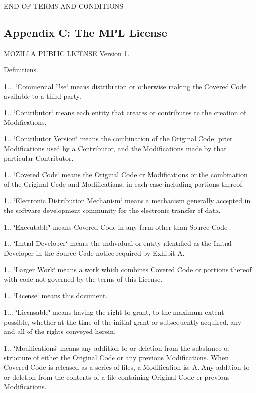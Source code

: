 E\+N\+D O\+F T\+E\+R\+M\+S A\+N\+D C\+O\+N\+D\+I\+T\+I\+O\+N\+S

\subsection*{Appendix C\+: The M\+P\+L License }

M\+O\+Z\+I\+L\+L\+A P\+U\+B\+L\+I\+C L\+I\+C\+E\+N\+S\+E Version 1.


\begin{DoxyEnumerate}
\item Definitions.

1... \char`\"{}\+Commercial Use\char`\"{} means distribution or otherwise making the Covered Code available to a third party.

1.. \char`\"{}\+Contributor\char`\"{} means each entity that creates or contributes to the creation of Modifications.

1.. \char`\"{}\+Contributor Version\char`\"{} means the combination of the Original Code, prior Modifications used by a Contributor, and the Modifications made by that particular Contributor.

1.. \char`\"{}\+Covered Code\char`\"{} means the Original Code or Modifications or the combination of the Original Code and Modifications, in each case including portions thereof.

1.. \char`\"{}\+Electronic Distribution Mechanism\char`\"{} means a mechanism generally accepted in the software development community for the electronic transfer of data.

1.. \char`\"{}\+Executable\char`\"{} means Covered Code in any form other than Source Code.

1.. \char`\"{}\+Initial Developer\char`\"{} means the individual or entity identified as the Initial Developer in the Source Code notice required by Exhibit A.

1.. \char`\"{}\+Larger Work\char`\"{} means a work which combines Covered Code or portions thereof with code not governed by the terms of this License.

1.. \char`\"{}\+License\char`\"{} means this document.

1... \char`\"{}\+Licensable\char`\"{} means having the right to grant, to the maximum extent possible, whether at the time of the initial grant or subsequently acquired, any and all of the rights conveyed herein.

1.. \char`\"{}\+Modifications\char`\"{} means any addition to or deletion from the substance or structure of either the Original Code or any previous Modifications. When Covered Code is released as a series of files, a Modification is\+: A. Any addition to or deletion from the contents of a file containing Original Code or previous Modifications.


\end{DoxyEnumerate}
